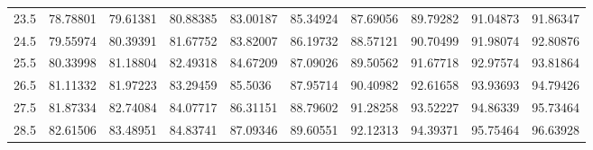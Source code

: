 \documentclass[10pt,twocolumn,letterpaper]{article}
\begin{document}
\begin{table}
\begin{tabular}{llllllllll}
    23.5            & 78.78801                               & 79.61381                               & 80.88385                                & 83.00187                                & 85.34924                                & 87.69056                                & 89.79282                                & 91.04873                                & 91.86347                                \\
    24.5            & 79.55974                               & 80.39391                               & 81.67752                                & 83.82007                                & 86.19732                                & 88.57121                                & 90.70499                                & 91.98074                                & 92.80876                                \\
    25.5            & 80.33998                               & 81.18804                               & 82.49318                                & 84.67209                                & 87.09026                                & 89.50562                                & 91.67718                                & 92.97574                                & 93.81864                                \\
    26.5            & 81.11332                               & 81.97223                               & 83.29459                                & 85.5036                                 & 87.95714                                & 90.40982                                & 92.61658                                & 93.93693                                & 94.79426                                \\
    27.5            & 81.87334                               & 82.74084                               & 84.07717                                & 86.31151                                & 88.79602                                & 91.28258                                & 93.52227                                & 94.86339                                & 95.73464                                \\
    28.5            & 82.61506                               & 83.48951                               & 84.83741                                & 87.09346                                & 89.60551                                & 92.12313                                & 94.39371                                & 95.75464                                & 96.63928                                \\

\end{tabular}
\end{table}
\end{document}
